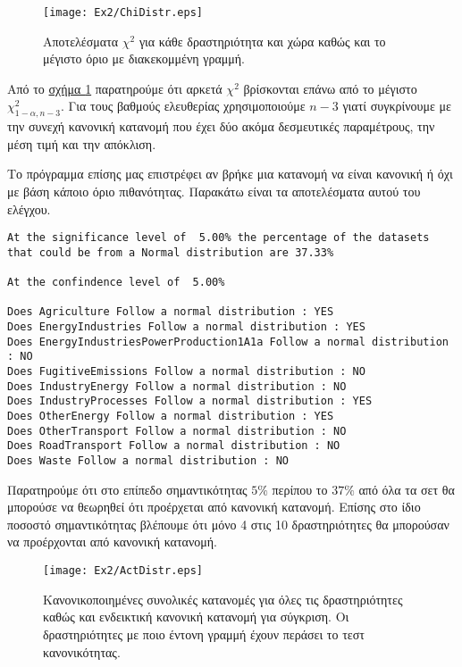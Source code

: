 \documentclass[11pt]{scrartcl} %
\begin{document}
\begin{figure}[H]

	\centering
	\texttt{[image: Ex2/ChiDistr.eps]}	
\caption{Αποτελέσματα $\chi^{2}$ για κάθε δραστηριότητα και χώρα καθώς και το μέγιστο όριο με διακεκομμένη γραμμή.}
\label{fig:z21} 
\end{figure}

Από το \hyperref[fig:z21]{σχήμα \ref*{fig:z21}} παρατηρούμε ότι αρκετά 
$\chi^{2}$ βρίσκονται επάνω από το μέγιστο $\chi^{2}_{1-\alpha,n-3}$. Για τους βαθμούς ελευθερίας χρησιμοποιούμε $n-3$ γιατί συγκρίνουμε με την συνεχή κανονική κατανομή που έχει δύο ακόμα δεσμευτικές παραμέτρους, την μέση τιμή και την απόκλιση.


Το πρόγραμμα επίσης μας επιστρέφει αν βρήκε μια κατανομή να είναι κανονική ή όχι με βάση κάποιο όριο πιθανότητας. Παρακάτω είναι τα αποτελέσματα αυτού του ελέγχου.

\begin{Verbatim}[fontsize=\small]
At the significance level of  5.00% the percentage of the datasets
that could be from a Normal distribution are 37.33% 

At the confindence level of  5.00%

Does Agriculture Follow a normal distribution : YES
Does EnergyIndustries Follow a normal distribution : YES
Does EnergyIndustriesPowerProduction1A1a Follow a normal distribution : NO
Does FugitiveEmissions Follow a normal distribution : NO
Does IndustryEnergy Follow a normal distribution : NO
Does IndustryProcesses Follow a normal distribution : YES
Does OtherEnergy Follow a normal distribution : YES
Does OtherTransport Follow a normal distribution : NO
Does RoadTransport Follow a normal distribution : NO
Does Waste Follow a normal distribution : NO
\end{Verbatim}

Παρατηρούμε ότι στο επίπεδο σημαντικότητας $5\%$ περίπου το $37\%$ από όλα τα σετ θα μπορούσε να θεωρηθεί ότι προέρχεται από κανονική κατανομή. Επίσης στο ίδιο ποσοστό σημαντικότητας βλέπουμε ότι μόνο 4 στις 10 δραστηριότητες θα μπορούσαν να προέρχονται από κανονική κατανομή.

\begin{figure}[H]

	\centering
	\texttt{[image: Ex2/ActDistr.eps]}	
\caption{Κανονικοποιημένες συνολικές κατανομές για όλες τις δραστηριότητες καθώς και ενδεικτική κανονική κατανομή για σύγκριση. Οι δραστηριότητες με ποιο έντονη γραμμή έχουν περάσει το τεστ κανονικότητας.}
\label{fig:z22} 
\end{figure}
\end{document}
